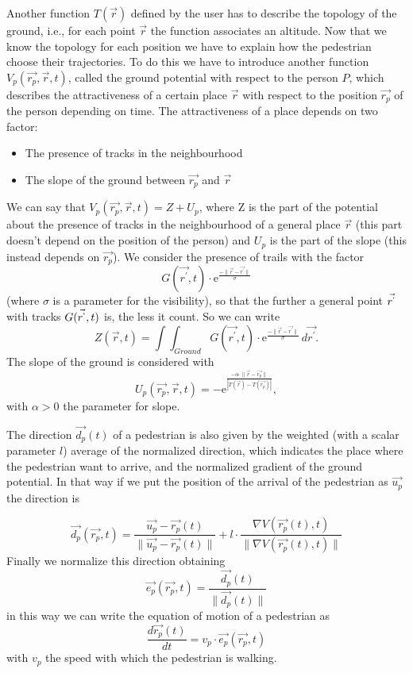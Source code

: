 \documentclass[11pt]{article}
\begin{document}
Another function $T(\vec{r})$ defined by the user has to describe the topology of the ground, i.e., for each point $\vec{r}$ the function associates an altitude. Now that we know the topology for each position we have to explain how the pedestrian choose their trajectories. To do this we have to introduce another function $V_{p}(\vec{r_p},\vec{r},t)$, called the ground potential with respect to the person $P$, which describes the attractiveness of a certain place $\vec{r}$ with respect to the position $\vec{r_p}$ of the person depending on time. The attractiveness of a place depends on two factor: 
\begin{itemize}
\item The presence of tracks in the neighbourhood
\item The slope of the ground between $\vec{r_p}$ and $\vec{r}$
\end{itemize} 
We can say that $V_{p}(\vec{r_p},\vec{r},t)=Z+U_p$, where Z is the part of the potential about the presence of tracks in the neighbourhood of a general place $\vec{r}$ (this part doesn't depend on the position of the person) and $U_p$ is the part of the slope (this instead depends on $\vec{r_p}$).
We consider the presence of trails with the factor
\[G(\vec{r^\prime},t) \cdot \mathrm{e}^{\frac{-\|\vec{r} -\vec{r^\prime}\|}{\sigma}}\]   
(where $\sigma$ is a parameter for the visibility), so that the further a general point $\vec{r^`}$ with tracks $G(\vec{r^`},t)$ is, the less it count.
So we can write 
\[Z(\vec{r},t)=
    \int \!\!\! \int_{Ground} G(\vec{r^\prime},t) \cdot \mathrm{e}^{\frac{-\|\vec{r} -\vec{r^\prime}\|}{\sigma}}\,d\vec{r^\prime} .\]
  The slope of the ground is considered with  \[U_p(\vec{r_p},\vec{r},t)=-\mathrm{e}^{\frac{-\alpha\cdot\|\vec{r}-\vec{r_p}\|}{|T(\vec{r})-T(\vec{r_p})|}},\]
with $\alpha>0$ the parameter for slope.

The direction $\vec{d_p}(t)$ of a pedestrian is also given by the weighted (with a scalar parameter $l$) average of the normalized direction, which indicates the place where the pedestrian want to arrive, and the normalized gradient of the ground potential. In that way if we put the position of the arrival of the pedestrian as $\vec{u_p}$  the direction is 

\[\vec{d_p}(\vec{r_p},t)=\frac{\vec{u_p} -\vec{r_p}(t)}{\| \vec{u_p} -
    \vec{r_p}(t)\|} +l\cdot \frac{\nabla V(\vec{r_p}(t),t)}{\|\nabla 
    V(\vec{r_p}(t),t)\|} \]
Finally we normalize this direction obtaining
\[\vec{e_p}(\vec{r_p},t)=\frac{\vec{d_p}(t)}{\|\vec{d_p}(t)\|} \]
in this way we can write the equation of motion of a pedestrian as 
\[\frac{d\vec{r_p}(t)}{dt}=v_p\cdot \vec{e_p}(\vec{r_p},t) \]
with $v_p$ the speed with which the pedestrian is walking. 
\newpage
\end{document}
